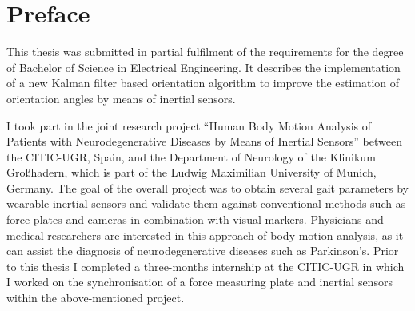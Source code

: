 \chapter*{Preface}

This thesis was submitted in partial fulfilment of the requirements for the degree of Bachelor of Science in Electrical Engineering. It describes the implementation of a new Kalman filter based orientation algorithm to improve the estimation of orientation angles by means of inertial sensors.

I took part in the joint research project “Human Body Motion Analysis of Patients with Neurodegenerative Diseases by Means of Inertial Sensors” between the \gls{CITIC-UGR}, Spain, and the Department of Neurology of the Klinikum Großhadern, which is part of the Ludwig Maximilian University of Munich, Germany. The goal of the overall project was to obtain several gait parameters by wearable inertial sensors and validate them against conventional methods such as force plates and cameras in combination with visual markers. Physicians and medical researchers are interested in this approach of body motion analysis, as it can assist the diagnosis of neurodegenerative diseases such as Parkinson's. Prior to this thesis I completed a three-months internship at the \gls{CITIC-UGR} in which I worked on the synchronisation of a force measuring plate and inertial sensors within the above-mentioned project.